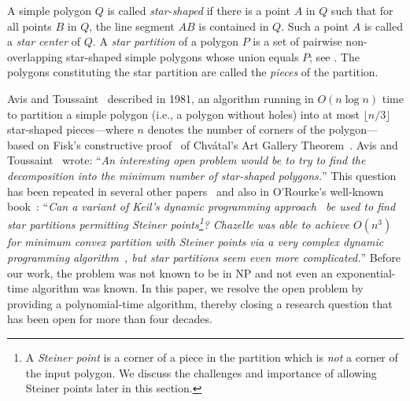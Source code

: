 \documentclass[10pt,a4paper]{article}
\makeatletter
\newcommand\IfRestateTF{%
  \ifx\label\thmt@gobble@label %
    \expandafter\@firstoftwo
  \else
    \expandafter\@secondoftwo
  \fi
}
\newcommand{\RestateRemark}{\IfRestateTF{{\normalfont\bfseries (Restated) }}{}}
\makeatother
\begin{document}
A simple polygon $Q$ is called \emph{star-shaped} if there is a point $A$ in $Q$ such that for all points $B$ in $Q$, the line segment $AB$ is contained in $Q$.
Such a point $A$ is called a \emph{star center} of $Q$.
A \emph{star partition} of a polygon $P$ is a set of pairwise non-overlapping star-shaped simple polygons whose union equals $P$; see .
The polygons constituting the star partition are called the \emph{pieces} of the partition.

Avis and Toussaint~\cite{DBLP:journals/pr/AvisT81} described in 1981, an algorithm running in $O(n\log n)$ time to partition a simple polygon (i.e., a polygon without holes) into at most $\lfloor n/3\rfloor$ star-shaped pieces---where $n$ denotes the number of corners of the polygon---based on Fisk's constructive proof~\cite{DBLP:journals/jct/Fisk78a} of Chv\'{a}tal's Art Gallery Theorem~\cite{chvatal1975combinatorial}.
Avis and Toussaint~\cite{DBLP:journals/pr/AvisT81} wrote: ``\emph{An interesting open problem would be to try to find the decomposition into the minimum number of star-shaped polygons.}''
This question has been repeated in several other papers~\cite{toussaint1982computational,DBLP:journals/tit/ORourkeS83,DBLP:journals/siamcomp/Keil85,DBLP:journals/pieee/Shermer92} and also in O'Rourke's well-known book~\cite{o1987art}: ``\emph{Can a variant of Keil's dynamic programming approach~\cite{DBLP:journals/siamcomp/Keil85} be used to find star partitions permitting Steiner points\footnote{\label{footnote:steiner-points}A \emph{Steiner point} is a corner of a piece in the partition which is \emph{not} a corner of the input polygon. We discuss the challenges and importance of allowing Steiner points later in this section.}? Chazelle was able to achieve $O(n^3)$ for minimum convex partition with Steiner points via a very complex dynamic programming algorithm~\cite{chazelle1980computational}, but star partitions seem even more complicated.}''
Before our work, the problem was not known to be in \textsf{NP} and not even an exponential-time algorithm was known.
In this paper, we resolve the open problem by providing a polynomial-time algorithm,
thereby closing a research question that has been open for more than four decades.


\end{document}
